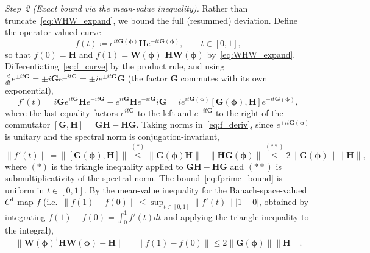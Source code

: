 \documentclass[11pt]{article}
\theoremstyle{plain}
\theoremstyle{plain}
\begin{document}
\emph{Step~2 (Exact bound via the mean-value inequality).}
Rather than truncate~\eqref{eq:WHW_expand}, we bound the full
(resummed) deviation.  Define the operator-valued curve
\begin{equation}\label{eq:f_curve}
  f(t)\coloneqq e^{it\mathbf{G}(\bm\phi)} \mathbf{H} e^{-it\mathbf{G}(\bm\phi)},
  \qquad t\in[0,1],
\end{equation}
so that $f(0)=\mathbf{H}$ and $f(1)=\mathbf{W}(\bm\phi)^\dagger\mathbf{H} \mathbf{W}(\bm\phi)$
by~\eqref{eq:WHW_expand}.  Differentiating~\eqref{eq:f_curve} by the
product rule, and using
$\tfrac{d}{dt}e^{\pm it\mathbf{G}}=\pm i\mathbf{G} e^{\pm it\mathbf{G}}=\pm i e^{\pm it\mathbf{G}}\mathbf{G}$
(the factor $\mathbf{G}$ commutes with its own exponential),
\begin{equation}\label{eq:f_deriv}
  f'(t)
  =i\mathbf{G} e^{it\mathbf{G}}\mathbf{H}e^{-it\mathbf{G}}
   -e^{it\mathbf{G}}\mathbf{H}e^{-it\mathbf{G}} i\mathbf{G}
  =i e^{it\mathbf{G}(\bm\phi)} [\mathbf{G}(\bm\phi),\mathbf{H}] e^{-it\mathbf{G}(\bm\phi)},
\end{equation}
where the last equality factors $e^{it\mathbf{G}}$ to the left and
$e^{-it\mathbf{G}}$ to the right of the commutator
$[\mathbf{G},\mathbf{H}]=\mathbf{G}\mathbf{H}-\mathbf{H}\mathbf{G}$.  Taking norms in~\eqref{eq:f_deriv},
since $e^{\pm it\mathbf{G}(\bm\phi)}$ is unitary and the spectral norm is
conjugation-invariant,
\begin{equation}\label{eq:fprime_bound}
  \|f'(t)\|
  =\|[\mathbf{G}(\bm\phi),\mathbf{H}]\|
  \overset{(\ast)}{\le}\|\mathbf{G}(\bm\phi)\mathbf{H}\|+\|\mathbf{H}\mathbf{G}(\bm\phi)\|
  \overset{(\ast\ast)}{\le}2 \|\mathbf{G}(\bm\phi)\| \|\mathbf{H}\|,
\end{equation}
where $(\ast)$ is the triangle inequality applied to
$\mathbf{G}\mathbf{H}-\mathbf{H}\mathbf{G}$ and $(\ast\ast)$ is submultiplicativity of the
spectral norm.  The bound~\eqref{eq:fprime_bound} is uniform in
$t\in[0,1]$.  By the mean-value inequality for the
Banach-space-valued $C^1$ map $f$ (i.e.\
$\|f(1)-f(0)\|\le\sup_{t\in[0,1]}\|f'(t)\| |1-0|$, obtained by
integrating $f(1)-f(0)=\int_0^1 f'(t) dt$ and applying the triangle
inequality to the integral),
\begin{equation}\label{eq:mvt_bound}
  \bigl\|\mathbf{W}(\bm\phi)^\dagger\mathbf{H} \mathbf{W}(\bm\phi)-\mathbf{H}\bigr\|
  =\|f(1)-f(0)\|
  \le 2 \|\mathbf{G}(\bm\phi)\| \|\mathbf{H}\|.
\end{equation}
\end{document}
